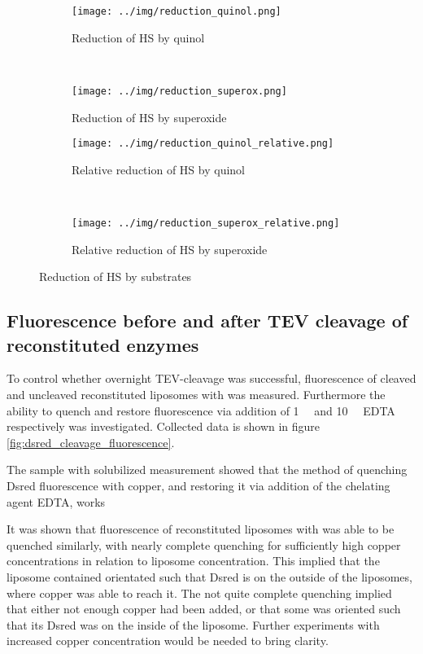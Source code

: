 \begin{figure*}
    \centering
    \begin{subfigure}{0.49\textwidth}
	\centering
	\texttt{[image: ../img/reduction\_quinol.png]}
	\caption{Reduction of HS by quinol}
	\label{fig:reduction_quinol}
    \end{subfigure}
    ~
    \begin{subfigure}{0.49\textwidth}
	\centering
	\texttt{[image: ../img/reduction\_superox.png]}
	\caption{Reduction of HS by superoxide}
	\label{fig:reduction_superox}
    \end{subfigure}

    \begin{subfigure}{0.49\textwidth}
	\centering
	\texttt{[image: ../img/reduction\_quinol\_relative.png]}
	\caption{Relative reduction of HS by quinol}
	\label{fig:reduction_quinol_relative}
    \end{subfigure}
    ~
    \begin{subfigure}{0.49\textwidth}
	\centering
	\texttt{[image: ../img/reduction\_superox\_relative.png]}
	\caption{Relative reduction of HS by superoxide}
	\label{fig:reduction_superox_relative}
    \end{subfigure}
    \caption{Reduction of HS by substrates}
    \label{fig:hs_reduction}
\end{figure*}


\subsection{Fluorescence before and after TEV cleavage of reconstituted enzymes}

To control whether overnight TEV-cleavage was successful, fluorescence of
cleaved and uncleaved reconstituted liposomes with \hsdsred{} was measured.
Furthermore the ability to quench and restore fluorescence via addition of
\SI{1}{\milli\Molar}  and \SI{10}{\milli\Molar} EDTA respectively
was investigated. Collected data is shown in figure
\ref{fig:dsred_cleavage_fluorescence}.

The sample with solubilized measurement showed that the method of quenching
Dsred fluorescence with copper, and restoring it via addition of the chelating
agent EDTA, works

It was shown that fluorescence of reconstituted liposomes with \hsdsred{} was
able to be quenched similarly, with nearly complete quenching for sufficiently
high copper concentrations in relation to liposome concentration. This implied
that the liposome contained \hsdsred{} orientated such that Dsred is on the
outside of the liposomes, where copper was able to reach it. The not quite
complete quenching implied that either not enough copper had been added, or
that some \hsdsred{} was oriented such that its Dsred was on the inside of the
liposome. Further experiments with increased copper concentration would be
needed to bring clarity.

